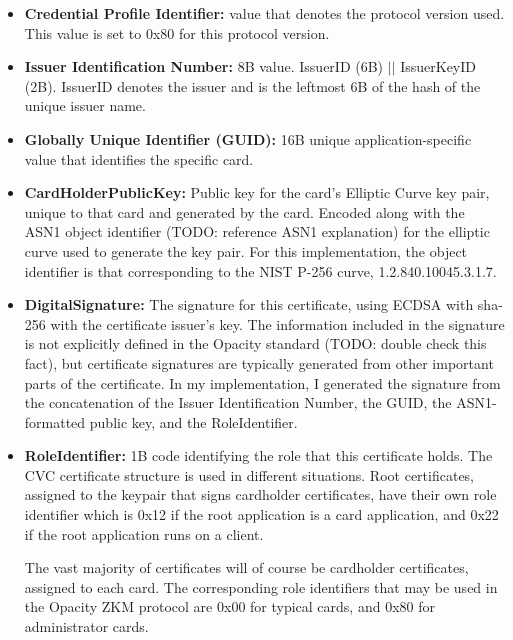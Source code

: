 \documentclass[12pt]{article}
\begin{document}
\begin{itemize}
	\item \textbf{Credential Profile Identifier:} value that denotes the protocol version used. This value is set to 0x80 for this protocol version.
	
	\item \textbf{Issuer Identification Number:} 8B value. IssuerID (6B) $||$ IssuerKeyID (2B). IssuerID denotes the issuer and is the leftmost 6B of the hash of the unique issuer name. 
	
	\item \textbf{Globally Unique Identifier (GUID):} 16B unique application-specific value that identifies the specific card.
	
	\item \textbf{CardHolderPublicKey:} Public key for the card's Elliptic Curve key pair, unique to that card and generated by the card. Encoded along with the ASN1 object identifier (TODO: reference ASN1 explanation) for the elliptic curve used to generate the key pair. For this implementation, the object identifier is that corresponding to the NIST P-256 curve, 1.2.840.10045.3.1.7.
	
	\item \textbf{DigitalSignature:} The signature for this certificate, using ECDSA with sha-256 with the certificate issuer's key. The information included in the signature is not explicitly defined in the Opacity standard (TODO: double check this fact), but certificate signatures are typically generated from other important parts of the certificate. In my implementation, I generated the signature from the concatenation of the Issuer Identification Number, the GUID, the ASN1-formatted public key, and the RoleIdentifier.
	
	\item \textbf{RoleIdentifier:} 1B code identifying the role that this certificate holds. The CVC certificate structure is used in different situations. Root certificates, assigned to the keypair that signs cardholder certificates, have their own role identifier which is 0x12 if the root application is a card application, and 0x22 if the root application runs on a client.
	
	The vast majority of certificates will of course be cardholder certificates, assigned to each card. The corresponding role identifiers that may be used in the Opacity ZKM protocol are 0x00 for typical cards, and 0x80 for administrator cards. 
\end{itemize}
\end{document}
